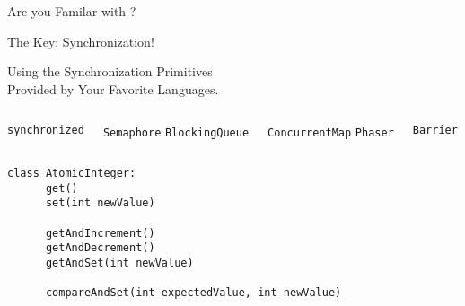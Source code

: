 \begin{frame}{}
  {\vspace{0.30cm}\centerline{\Large Are you Familar with ?}}
\end{frame}

\begin{frame}{}
    {\vspace{0.30cm}\centerline{\Large The Key: Synchronization!}}
\end{frame}

\begin{frame}{}

  \begin{center}
    {\Large Using the Synchronization Primitives \\ Provided by Your Favorite Languages.}
  \end{center}
\end{frame}

\begin{frame}[fragile]{}

  \begin{columns}
      \texttt{synchronized}

      \texttt{Semaphore}
      \texttt{BlockingQueue}
      
      \texttt{ConcurrentMap}
      \texttt{Phaser}

      \texttt{Barrier}
  \end{columns}

  \vspace{0.80cm}
  \pause
  \begin{lstlisting}[style = Cstyle]
    class AtomicInteger:
      get()
      set(int newValue)

      getAndIncrement()
      getAndDecrement()
      getAndSet(int newValue)

      compareAndSet(int expectedValue, int newValue)
  \end{lstlisting}
\end{frame}

